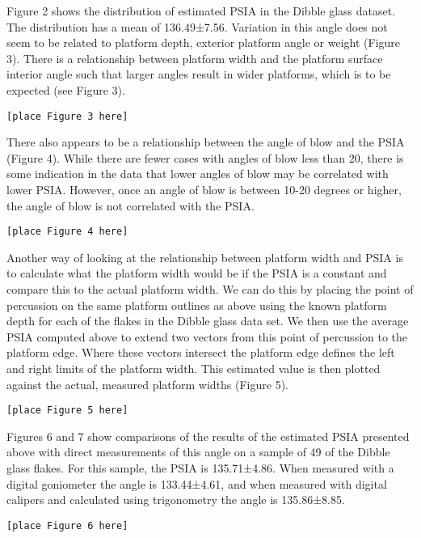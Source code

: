 \documentclass[10pt,letterpaper]{article}
\begin{document}
Figure 2 shows the distribution of estimated PSIA in the Dibble glass
dataset. The distribution has a mean of 136.49±7.56. Variation in this
angle does not seem to be related to platform depth, exterior platform
angle or weight (Figure 3). There is a relationship between platform
width and the platform surface interior angle such that larger angles
result in wider platforms, which is to be expected (see Figure 3).

\begin{verbatim}
[place Figure 3 here]
\end{verbatim}

There also appears to be a relationship between the angle of blow and
the PSIA (Figure 4). While there are fewer cases with angles of blow
less than 20, there is some indication in the data that lower angles of
blow may be correlated with lower PSIA. However, once an angle of blow
is between 10-20 degrees or higher, the angle of blow is not correlated
with the PSIA.

\begin{verbatim}
[place Figure 4 here]
\end{verbatim}

Another way of looking at the relationship between platform width and
PSIA is to calculate what the platform width would be if the PSIA is a
constant and compare this to the actual platform width. We can do this
by placing the point of percussion on the same platform outlines as
above using the known platform depth for each of the flakes in the
Dibble glass data set. We then use the average PSIA computed above to
extend two vectors from this point of percussion to the platform edge.
Where these vectors intersect the platform edge defines the left and
right limits of the platform width. This estimated value is then plotted
against the actual, measured platform widths (Figure 5).

\begin{verbatim}
[place Figure 5 here]
\end{verbatim}

Figures 6 and 7 show comparisons of the results of the estimated PSIA
presented above with direct measurements of this angle on a sample of 49
of the Dibble glass flakes. For this sample, the PSIA is 135.71±4.86.
When measured with a digital goniometer the angle is 133.44±4.61, and
when measured with digital calipers and calculated using trigonometry
the angle is 135.86±8.85.

\begin{verbatim}
[place Figure 6 here]
\end{verbatim}
\end{document}
